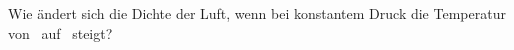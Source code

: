 Wie ändert sich die Dichte der Luft, wenn bei konstantem Druck die Temperatur von \thEiO\ auf \thZwO\ steigt?
